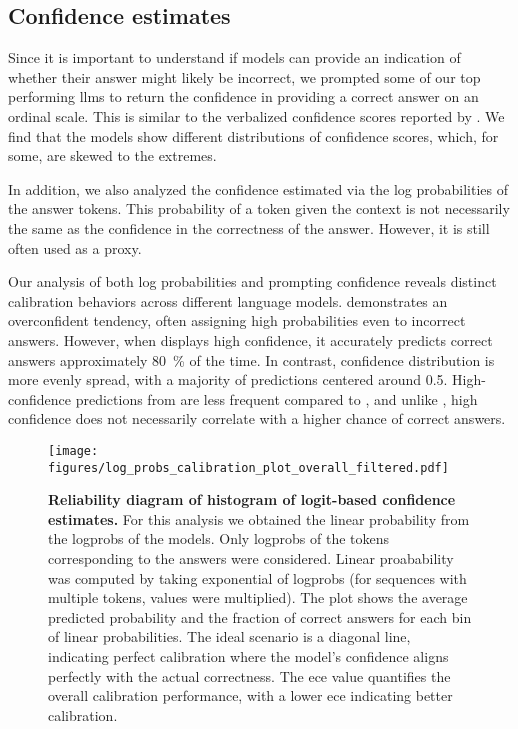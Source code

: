 \clearpage
\subsection{Confidence estimates} \label{sec:confidence_estimates}

Since it is important to understand if models can provide an indication of whether their answer might likely be incorrect, we prompted some of our top performing \glspl{llm} to return the confidence in providing a correct answer on an ordinal scale.
This is similar to the verbalized confidence scores reported by \textcite{xiong2023llms}.
We find that the models show different distributions of confidence scores, which, for some, are skewed to the extremes.

In addition, we also analyzed the confidence estimated via the log probabilities of the answer tokens. This probability of a token given the context is not necessarily the same as the confidence in the correctness of the answer. However, it is still often used as a proxy.

Our analysis of both log probabilities and prompting confidence reveals distinct calibration behaviors across different language models.
\GPTFourO demonstrates an overconfident tendency, often assigning high probabilities even to incorrect answers.
However, when \GPTFourO displays high confidence, it accurately predicts correct answers approximately \SI{80}{\percent} of the time. In contrast, \LlamaThreeOneEightBInstruct confidence distribution is more evenly spread, with a majority of predictions centered around 0.5. High-confidence predictions from \LlamaThreeOneEightBInstruct are less frequent compared to \GPTFourO, and unlike \GPTFourO, high confidence does not necessarily correlate with a higher chance of correct answers.

\begin{figure}[htb]
    \centering
    \texttt{[image: figures/log\_probs\_calibration\_plot\_overall\_filtered.pdf]}
    \caption{\textbf{Reliability diagram of histogram of logit-based confidence estimates.} For this analysis we obtained the linear probability from the logprobs of the models. Only logprobs of the tokens corresponding to the answers were considered. Linear proabability was computed by taking exponential of logprobs (for sequences with multiple tokens, values were multiplied).  The plot shows the average predicted probability and the fraction of correct answers for each bin of linear probabilities. The ideal scenario is a diagonal line, indicating perfect calibration where the model's confidence aligns perfectly with the actual correctness. The \gls{ece} value quantifies the overall calibration performance, with a lower \gls{ece} indicating better calibration.}
    \label{fig:confidence_score_distributions}
\end{figure}

